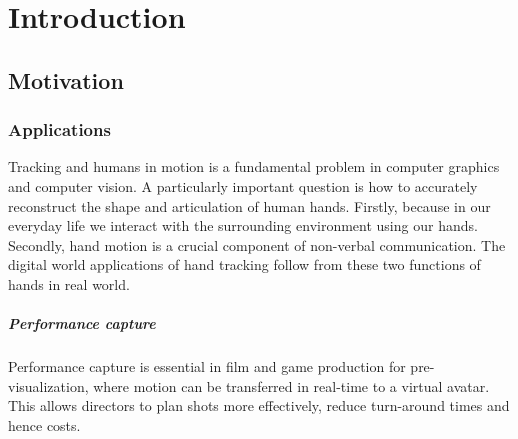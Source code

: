 

\usepackage{cite}
\usepackage{amsmath}
\usepackage{microtype}
\usepackage{overpic}
\usepackage{color}
\usepackage{amssymb}
\usepackage{graphicx}
\usepackage{changepage}
\usepackage{hyperref}
\usepackage{longtable}

\hypersetup{
    colorlinks=true,
    filecolor=magenta,      
    urlcolor=cyan,
}

  








\frontmatter

%
%
%
%

\tableofcontents

\setlength{\parskip}{1em}

\mainmatter


\chapter{Introduction}

\section{Motivation}

\subsection*{Applications}

Tracking and humans in motion is a fundamental problem in computer graphics and computer vision. A particularly important question is how to accurately reconstruct the shape and articulation of human hands. Firstly, because in our everyday life we interact with the surrounding environment using our hands. Secondly, hand motion is a crucial component of non-verbal communication. The digital world applications of hand tracking follow from these two functions of hands in real world.

\paragraph{Performance capture} Performance capture is essential in film and game production for pre-visualization, where motion can be transferred in real-time to a virtual avatar. This allows directors to plan shots more effectively, reduce turn-around times and hence costs. 

